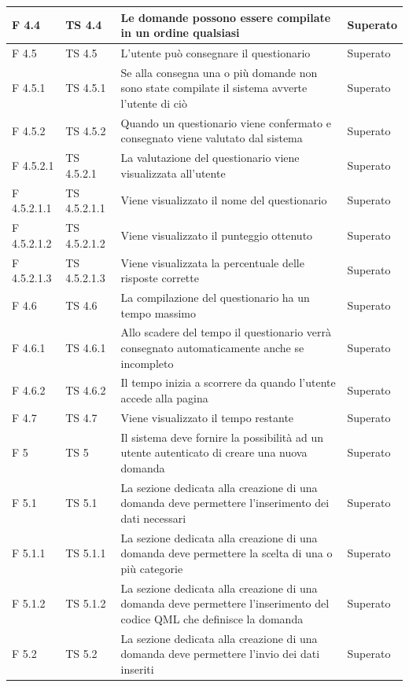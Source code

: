 \documentclass[a4paper,11pt]{article}
\begin{document}
\begin{longtable}{p{}p{}p{}p{}}
\midrule
F 4.4 & TS 4.4 &Le domande possono essere compilate in un ordine qualsiasi & Superato\\
\midrule
F 4.5 &TS 4.5 &L'utente può consegnare il questionario & Superato\\
\midrule
F 4.5.1 & TS 4.5.1 &Se alla consegna una o più domande non sono state compilate il sistema avverte l'utente di ciò & Superato\\
\midrule
F 4.5.2 & TS 4.5.2 &Quando un questionario viene confermato e consegnato viene valutato dal sistema & Superato\\
\midrule
F 4.5.2.1 & TS 4.5.2.1 &La valutazione del questionario viene visualizzata all'utente & Superato\\
\midrule
F 4.5.2.1.1 &TS 4.5.2.1.1 &Viene visualizzato il nome del questionario & Superato\\
\midrule
F 4.5.2.1.2 & TS 4.5.2.1.2 &Viene visualizzato il punteggio ottenuto & Superato\\
\midrule
F 4.5.2.1.3 & TS 4.5.2.1.3 &Viene visualizzata la percentuale delle risposte corrette & Superato\\
\midrule
F 4.6 & TS 4.6&La compilazione del questionario ha un tempo massimo & Superato\\
\midrule
F 4.6.1 & TS 4.6.1 &Allo scadere del tempo il questionario verrà consegnato automaticamente anche se incompleto & Superato\\
\midrule
F 4.6.2 & TS 4.6.2 &Il tempo inizia a scorrere da quando l'utente accede alla pagina & Superato\\
\midrule
F 4.7 &TS 4.7 &Viene visualizzato il tempo restante & Superato\\
\midrule
F 5 & TS 5&Il sistema deve fornire la possibilità ad un utente autenticato di creare una nuova domanda & Superato\\
\midrule
F 5.1 &TS 5.1&La sezione dedicata alla creazione di una domanda deve permettere l'inserimento dei dati necessari & Superato\\
\midrule
F 5.1.1 & TS 5.1.1 &La sezione dedicata alla creazione di una domanda deve permettere la scelta di una o più categorie & Superato\\
\midrule
F 5.1.2 & TS 5.1.2 &La sezione dedicata alla creazione di una domanda deve permettere l'inserimento del codice QML che definisce la domanda & Superato\\
\midrule
F 5.2 & TS 5.2&La sezione dedicata alla creazione di una domanda deve permettere l'invio dei dati inseriti & Superato\\

\end{longtable}
\end{document}
